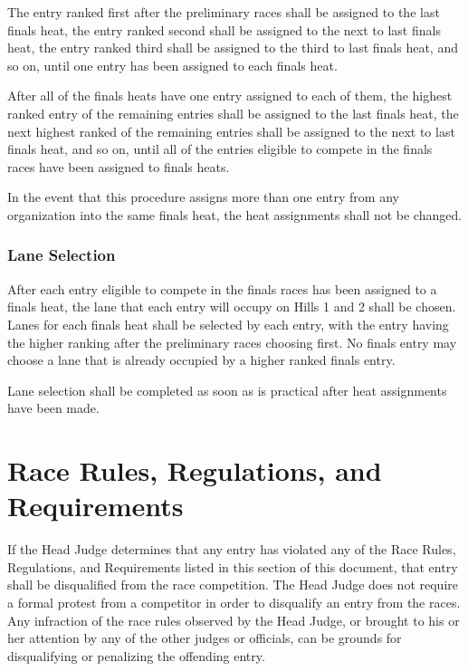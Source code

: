 	The entry ranked first after the preliminary races shall be assigned to the
	last finals heat, the entry ranked second shall be assigned to the next to last
	finals heat, the entry ranked third shall be assigned to the third to last
	finals heat, and so on, until one entry has been assigned to each finals heat.

	After all of the finals heats have one entry assigned to each of them, the
	highest ranked entry of the remaining entries shall be assigned to the last
	finals heat, the next highest ranked of the remaining entries shall be assigned
	to the next to last finals heat, and so on, until all of the entries eligible
	to compete in the finals races have been assigned to finals heats.

	In the event that this procedure assigns more than one entry from any
	organization into the same finals heat, the heat assignments shall not be
	changed.

\subsubsection{Lane Selection}

	After each entry eligible to compete in the finals races has been assigned to a
	finals heat, the lane that each entry will occupy on Hills 1 and 2 shall be
	chosen. Lanes for each finals heat shall be selected by each entry, with the
	entry having the higher ranking after the preliminary races choosing first. No
	finals entry may choose a lane that is already occupied by a higher ranked
	finals entry.

	Lane selection shall be completed as soon as is practical after heat
	assignments have been made.

\section{Race Rules, Regulations, and Requirements}

	If the Head Judge determines that any entry has violated any of the Race Rules,
	Regulations, and Requirements listed in this section of this document, that
	entry shall be disqualified from the race competition. The Head Judge does not
	require a formal protest from a competitor in order to disqualify an entry from
	the races. Any infraction of the race rules observed by the Head Judge, or
	brought to his or her attention by any of the other judges or officials, can be
	grounds for disqualifying or penalizing the offending entry.

